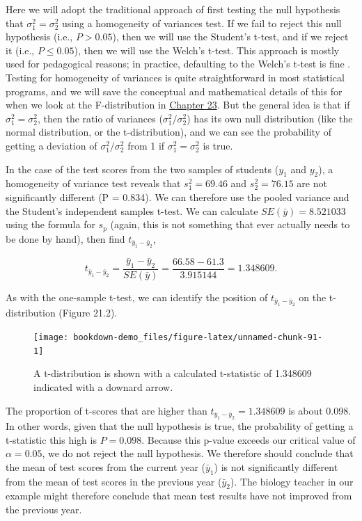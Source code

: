\documentclass[
]{scrbook}
\begin{document}
Here we will adopt the traditional approach of first testing the null hypothesis that \(\sigma^{2}_{1} = \sigma^{2}_{2}\) using a homogeneity of variances test.
If we fail to reject this null hypothesis (i.e., \(P > 0.05\)), then we will use the Student's t-test, and if we reject it (i.e., \(P \leq 0.05\)), then we will use the Welch's t-test.
This approach is mostly used for pedagogical reasons; in practice, defaulting to the Welch's t-test is fine \citep{Ruxton2006, Delacre2017}.
Testing for homogeneity of variances is quite straightforward in most statistical programs, and we will save the conceptual and mathematical details of this for when we look at the F-distribution in \protect\hyperlink{Chapter_23}{Chapter 23}.
But the general idea is that if \(\sigma^{2}_{1} = \sigma^{2}_{2}\), then the ratio of variances (\(\sigma^{2}_{1}/\sigma^{2}_{2}\)) has its own null distribution (like the normal distribution, or the t-distribution), and we can see the probability of getting a deviation of \(\sigma^{2}_{1}/\sigma^{2}_{2}\) from 1 if \(\sigma^{2}_{1} = \sigma^{2}_{2}\) is true.

In the case of the test scores from the two samples of students (\(y_{1}\) and \(y_{2}\)), a homogeneity of variance test reveals that \(s^{2}_{1} = 69.46\) and \(s^{2}_{2} = 76.15\) are not significantly different (P = 0.834).
We can therefore use the pooled variance and the Student's independent samples t-test.
We can calculate \(SE(\bar{y}) = 8.521033\) using the formula for \(s_{p}\) (again, this is not something that ever actually needs to be done by hand), then find \(t_{\bar{y}_{1} - \bar{y}_{2}}\),

\[t_{\bar{y}_{1} - \bar{y}_{2}} = \frac{\bar{y}_{1} - \bar{y}_{2}}{SE(\bar{y})} = \frac{66.58 - 61.3}{3.915144} = 1.348609.\]

As with the one-sample t-test, we can identify the position of \(t_{\bar{y}_{1} - \bar{y}_{2}}\) on the t-distribution (Figure 21.2).

\begin{figure}
\texttt{[image: bookdown-demo\_files/figure-latex/unnamed-chunk-91-1]} \caption{A t-distribution is shown with a calculated t-statistic of 1.348609 indicated with a downard arrow.}\label{fig:unnamed-chunk-91}
\end{figure}

The proportion of t-scores that are higher than \(t_{\bar{y}_{1} - \bar{y}_{2}} = 1.348609\) is about 0.098.
In other words, given that the null hypothesis is true, the probability of getting a t-statistic this high is \(P = 0.098\).
Because this p-value exceeds our critical value of \(\alpha = 0.05\), we do not reject the null hypothesis.
We therefore should conclude that the mean of test scores from the current year (\(\bar{y}_{1}\)) is not significantly different from the mean of test scores in the previous year (\(\bar{y}_{2}\)).
The biology teacher in our example might therefore conclude that mean test results have not improved from the previous year.
\end{document}
